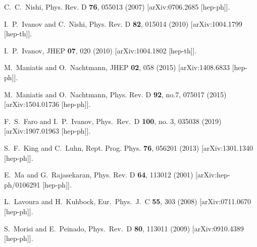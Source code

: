 \documentclass[11pt]{article}
\begin{document}
\begin{thebibliography}{99}
C.~C.~Nishi,
Phys. Rev. D \textbf{76}, 055013 (2007)
[arXiv:0706.2685 [hep-ph]].

I.~P.~Ivanov and C.~Nishi,
Phys. Rev. D \textbf{82}, 015014 (2010)
[arXiv:1004.1799 [hep-th]].

I.~P.~Ivanov,
JHEP \textbf{07}, 020 (2010)
[arXiv:1004.1802 [hep-th]].

M.~Maniatis and O.~Nachtmann,
JHEP \textbf{02}, 058 (2015)
[arXiv:1408.6833 [hep-ph]].

M.~Maniatis and O.~Nachtmann,
Phys. Rev. D \textbf{92}, no.7, 075017 (2015)
[arXiv:1504.01736 [hep-ph]].

	
F.~S.~Faro and I.~P.~Ivanov,
Phys.\ Rev.\ D {\bf 100}, no. 3, 035038 (2019)
[arXiv:1907.01963 [hep-ph]].

S.~F.~King and C.~Luhn,
Rept. Prog. Phys. \textbf{76}, 056201 (2013)
[arXiv:1301.1340 [hep-ph]].


E.~Ma and G.~Rajasekaran,
Phys. Rev. D \textbf{64}, 113012 (2001)
[arXiv:hep-ph/0106291 [hep-ph]].

L.~Lavoura and H.~Kuhbock,
Eur.\ Phys.\ J.\ C {\bf 55}, 303 (2008)
[arXiv:0711.0670 [hep-ph]].

S.~Morisi and E.~Peinado,
Phys.\ Rev.\ D {\bf 80}, 113011 (2009)
[arXiv:0910.4389 [hep-ph]].


\end{thebibliography}
\end{document}
